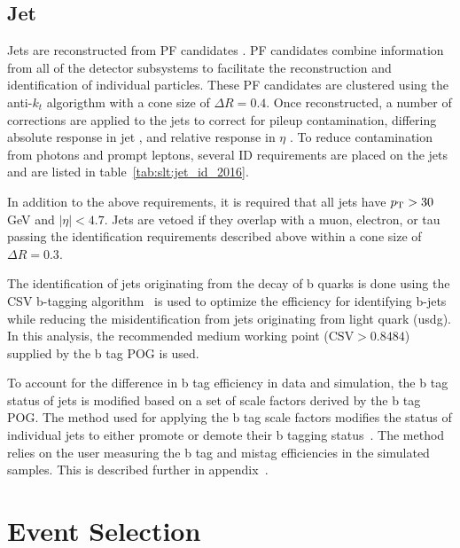 \subsection{Jet}
Jets are reconstructed from PF candidates \cite{ref:pf}. PF candidates combine information from all of the detector subsystems to facilitate the reconstruction and identification of individual particles.  These PF candidates are clustered using the anti-$k_{t}$ algorigthm \cite{Cacciari:2008gp} with a cone size of $\Delta R = 0.4$. Once reconstructed, a number of corrections are applied to the jets to correct for pileup contamination, differing absolute response in jet \pt, and relative response in $\eta$ \cite{ref:jetscale}.  To reduce contamination from photons and prompt leptons, several ID requirements are placed on the jets and are listed in table~\ref{tab:slt:jet_id_2016}.



\noindent In addition to the above requirements, it is required that all jets have $p_{\mathrm{T}} > 30$ GeV and $\left|\eta\right| < 4.7$.  Jets are vetoed if they overlap with a muon, electron, or tau passing the identification requirements described above within a cone size of $\Delta R = 0.3$. 

The identification of jets originating from the decay of b quarks is done using the CSV b-tagging algorithm~\cite{Sirunyan:2298594} is used to optimize the efficiency for identifying b-jets while reducing the misidentification from jets originating from light quark (usdg).  In this analysis, the recommended medium working point ($\text{CSV} > 0.8484$) supplied by the b tag POG is used.  

To account for the difference in b tag efficiency in data and simulation, the b tag status of jets is modified based on a set of scale factors derived by the b tag POG.  The method used for applying the b tag scale factors modifies the status of individual jets to either promote or demote their b tagging status~\cite{twiki:btag_method}.  The method relies on the user measuring the b tag and mistag efficiencies in the simulated samples.  This is described further in appendix~\label{app:btag}.




\section{Event Selection}
\label{sec:slt:eventSelection}

